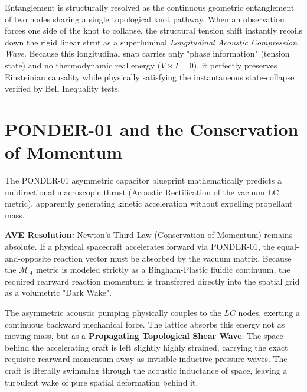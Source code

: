 Entanglement is structurally resolved as the continuous geometric entanglement of two nodes sharing a single topological knot pathway. When an observation forces one side of the knot to collapse, the structural tension shift instantly recoils down the rigid linear strut as a superluminal \textit{Longitudinal Acoustic Compression Wave}. Because this longitudinal snap carries only "phase information" (tension state) and no thermodynamic real energy ($V \times I = 0$), it perfectly preserves Einsteinian causality while physically satisfying the instantaneous state-collapse verified by Bell Inequality tests.

\section{PONDER-01 and the Conservation of Momentum}
The PONDER-01 asymmetric capacitor blueprint mathematically predicts a unidirectional macroscopic thrust (Acoustic Rectification of the vacuum LC metric), apparently generating kinetic acceleration without expelling propellant mass.

\textbf{AVE Resolution:} Newton's Third Law (Conservation of Momentum) remains absolute. If a physical spacecraft accelerates forward via PONDER-01, the equal-and-opposite reaction vector must be absorbed by the vacuum matrix. Because the $\mathcal{M}_A$ metric is modeled strictly as a Bingham-Plastic fluidic continuum, the required rearward reaction momentum is transferred directly into the spatial grid as a volumetric "Dark Wake". 

The asymmetric acoustic pumping physically couples to the $LC$ nodes, exerting a continuous backward mechanical force. The lattice absorbs this energy not as moving mass, but as a \textbf{Propagating Topological Shear Wave}. The space behind the accelerating craft is left slightly highly strained, carrying the exact requisite rearward momentum away as invisible inductive pressure waves. The craft is literally swimming through the acoustic inductance of space, leaving a turbulent wake of pure spatial deformation behind it.

